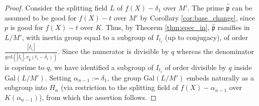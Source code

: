 \documentclass[a4paper]{amsart}
\begin{document}
\begin{proof}
Consider the splitting field $L$ of $f(X)-\delta_1$ over $M'$.  The prime $\widehat{\mathfrak{p}}$ can be assumed to be good for $f(X)-t$ over $M'$ by Corollary \ref{cor:base_change}, since $p$ is good for $f(X)-t$ over $K$. Thus, by Theorem \ref{thm:spec_in}, $\widehat{\mathfrak{p}}$ ramifies in $L/M'$, with inertia group equal to a subgroup of $I_{t_i}$ (up to conjugacy), of order $\frac{|I_{t_i}|}{\textrm{gcd}(|I_{t_i}|, \nu_{\widehat{\mathfrak{p}}}(t_i-\delta_1))}$. Since the numerator is divisible by $q$ whereas the denominator is coprime to $q$, we have identified a subgroup of $I_{t_i}$ of order divisible by $q$ inside $\textrm{Gal}(L/M')$. Setting $\alpha_{n-1}:=\delta_1$, the group $\textrm{Gal}(L/M')$ embeds naturally as a subgroup into $H_n$ (via restriction to the splitting field of $f(X)-\alpha_{n-1}$ over $K(\alpha_{n-1})$), from which the assertion follows.
  \end{proof}
  
\end{document}
